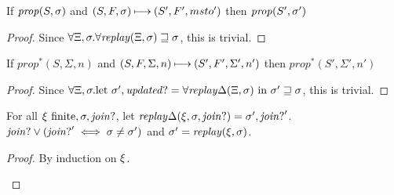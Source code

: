\documentclass{llncs}
\newcommand{\prop}{\mathit{prop}}
\begin{document}
\begin{lemma}\label{monstore}
If $\prop(S,\msto)$ and $(S,F,\sigma) \mathbin{\longmapsto} (S',F',msto')$ then $\prop(S',\msto')$
\end{lemma}
\begin{proof}
Since $\forall \Xi,\sigma.\forall\mathit{replay}(\Xi,\sigma) \sqsupseteq \sigma$, this is trivial.
\end{proof}

\begin{lemma}\label{montime}
If $\prop^*(S,\Sigma,n)$ and $(S,F,\Sigma,n) \mathbin{\longmapsto} (S',F',\Sigma',n')$ then $\prop^*(S',\Sigma',n')$
\end{lemma}
\begin{proof}
Since $\forall \Xi,\sigma. \text{let } \sigma',\mathit{updated?} = \forall\mathit{replay}\Delta(\Xi,\sigma) \text{ in } \sigma' \sqsupseteq \sigma$,
this is trivial.
\end{proof}

\begin{lemma}
For all $\xi \text{ finite},\sigma,\mathit{join?}$, let $\mathit{replay}\Delta(\xi,\sigma,\mathit{join?}) = \sigma',\mathit{join?}'$.
$\mathit{join?} \vee (\mathit{join?}' \iff \sigma \neq \sigma')$ and $\sigma' = \mathit{replay}(\xi,\sigma)$.
\end{lemma}
\begin{proof}
By induction on $\xi$.
\begin{byCases}
\end{byCases}
\end{proof}
\end{document}
